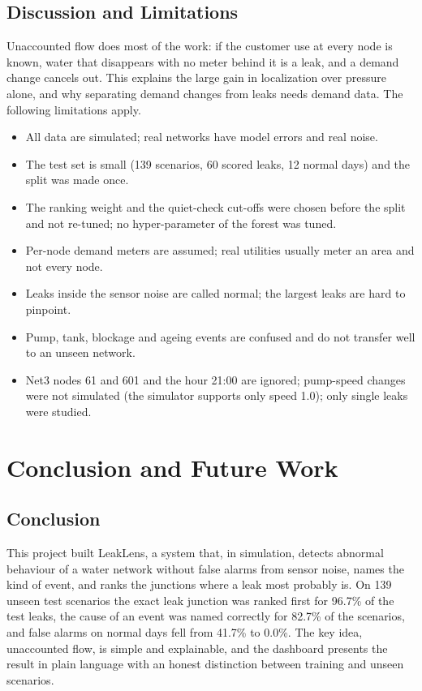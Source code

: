 \documentclass[11pt,letterpaper]{report}
\theoremstyle{definition}
\theoremstyle{plain}
\theoremstyle{remark}
\begin{document}
\section{Discussion and Limitations}
Unaccounted flow does most of the work: if the customer use at every node is known, water that disappears with no meter behind it is a leak, and a demand change cancels out. This explains the large gain in localization over pressure alone, and why separating demand changes from leaks needs demand data. The following limitations apply.
\begin{itemize}
\item All data are simulated; real networks have model errors and real noise.
\item The test set is small (139 scenarios, 60 scored leaks, 12 normal days) and the split was made once.
\item The ranking weight and the quiet-check cut-offs were chosen before the split and not re-tuned; no hyper-parameter of the forest was tuned.
\item Per-node demand meters are assumed; real utilities usually meter an area and not every node.
\item Leaks inside the sensor noise are called normal; the largest leaks are hard to pinpoint.
\item Pump, tank, blockage and ageing events are confused and do not transfer well to an unseen network.
\item Net3 nodes 61 and 601 and the hour 21:00 are ignored; pump-speed changes were not simulated (the simulator supports only speed 1.0); only single leaks were studied.
\end{itemize}

\chapter{Conclusion and Future Work}
\section{Conclusion}
This project built LeakLens, a system that, in simulation, detects abnormal behaviour of a water network without false alarms from sensor noise, names the kind of event, and ranks the junctions where a leak most probably is. On 139 unseen test scenarios the exact leak junction was ranked first for 96.7\% of the test leaks, the cause of an event was named correctly for 82.7\% of the scenarios, and false alarms on normal days fell from 41.7\% to 0.0\%. The key idea, unaccounted flow, is simple and explainable, and the dashboard presents the result in plain language with an honest distinction between training and unseen scenarios.
\end{document}
